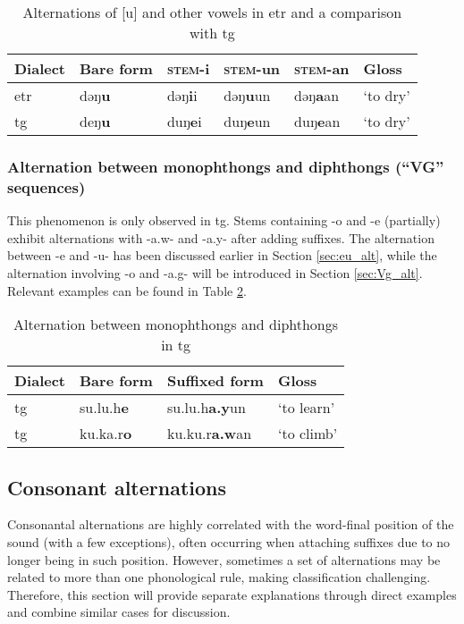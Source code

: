 \begin{table}[!htbp]
\centering
\caption{Alternations of [u] and other vowels in \acl{etr} and a comparison with \acl{tg}}
\label{tab:eu_alt_special}
\begin{tabular}{llllll}
\hline
Dialect   & Bare form & \textsc{stem}-i & \textsc{stem}-un & \textsc{stem}-an & Gloss    \\ \hline
\acl{etr} & dəŋ\textbf{u}      & dəŋ\textbf{i}i   & dəŋ\textbf{u}un   & dəŋ\textbf{a}an   & `to dry' \\
\acl{tg}  & deŋ\textbf{u}      & duŋ\textbf{e}i   & duŋ\textbf{e}un   & duŋ\textbf{e}an   & `to dry' \\ \hline
\end{tabular}
\end{table}

\subsubsection{Alternation between monophthongs and diphthongs (``VG'' sequences)}

This phenomenon is only observed in \acl{tg}. Stems containing -o and -e (partially) exhibit alternations with -a.w- and -a.y- after adding suffixes. The alternation between -e and -u- has been discussed earlier in Section \ref{sec:eu_alt}, while the alternation involving -o and -a.g- will be introduced in Section \ref{sec:Vg_alt}. Relevant examples can be found in Table \ref{tab:oeaway_alt}.

\begin{table}[!htbp]
\centering
\caption{Alternation between monophthongs and diphthongs in \acl{tg}}
\label{tab:oeaway_alt}
\begin{tabular}{llll}
\hline
Dialect  & Bare form & Suffixed form & Gloss      \\ \hline
\acl{tg} & su.lu.h\textbf{e}  & su.lu.h\textbf{a.y}un  & `to learn' \\
\acl{tg} & ku.ka.r\textbf{o}  & ku.ku.r\textbf{a.w}an  & `to climb' \\ \hline
\end{tabular}
\end{table}

\subsection{Consonant alternations}

Consonantal alternations are highly correlated with the word-final position of the sound (with a few exceptions), often occurring when attaching suffixes due to no longer being in such position. However, sometimes a set of alternations may be related to more than one phonological rule, making classification challenging. Therefore, this section will provide separate explanations through direct examples and combine similar cases for discussion.

